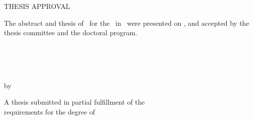 \pagestyle{empty} 



\long{}

 \begin{center} THESIS APPROVAL \end{center}
        \noindent The abstract and thesis of \thesisAuthor~for 
        the \thesisDegree~in \thesisDept~were presented on \thesisDate,
        and accepted by the thesis committee and the doctoral program.        

    \signature{COMMITTEE APPROVALS:}\thesisAdvisor    
    \signature{\ }\thesisCommitteeOne
    \signature{\ }\thesisCommitteeTwo

\clearpage







\clearpage
    
\begin{center}
	~\\
	~\\
	~\\
    \MakeUppercase {\thesisTitle} 
\end{center}

\begin{center}
    by\\
    \vspace{2mm}
    \MakeUppercase{\thesisAuthor}
\end{center}

\vfill\vfill

\begin{center}
    A thesis submitted in partial fulfillment of the\\
	\vspace{-2mm} 
    requirements for the degree of
\end{center}

